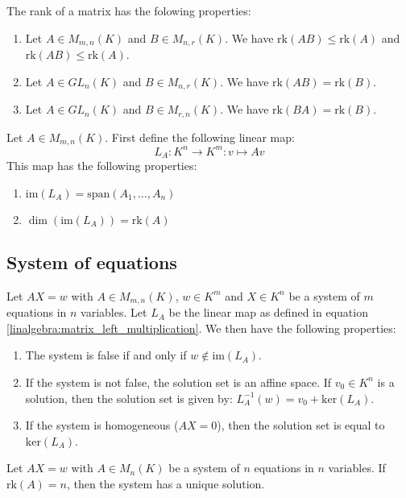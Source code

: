 	\begin{property}\label{linalgebra:rank_properties}
	        The rank of a matrix has the folowing properties:
        	\begin{enumerate}
			\item Let $A\in M_{m,n}(K)$ and $B\in M_{n,r}(K)$. We have $\text{rk}(AB)\leq\text{rk}(A)$ and $\text{rk}(AB)\leq\text{rk}(A)$.
        		\item Let $A\in GL_n(K)$ and $B\in M_{n,r}(K)$. We have $\text{rk}(AB)=\text{rk}(B)$.
		        \item Let $A\in GL_n(K)$ and $B\in M_{r,n}(K)$. We have $\text{rk}(BA)=\text{rk}(B)$.
		\end{enumerate}
	\end{property}
	\begin{property}\label{linalgebra:dim_matrix_left_multiplication}
	        Let $A\in M_{m,n}(K)$. First define the following linear map:
        	\begin{equation}
			\label{linalgebra:matrix_left_multiplication}
        		\boxed{L_A:K^n\rightarrow K^m:v\mapsto Av}
		\end{equation}
	        This map has the following properties:
        	\begin{enumerate}
        		\item $\text{im}(L_A) = \text{span}(A_1, ..., A_n)$
			\item $\dim(\text{im}(L_A))=\text{rk}(A)$
		\end{enumerate}
	\end{property}
    
\subsection{System of equations}

	\begin{theorem}\label{linalgebra:matrix_and_equations}
	        Let $AX=w$ with $A\in M_{m,n}(K)$, $w\in K^m$ and $X\in K^n$ be a system of $m$ equations in $n$ variables. Let $L_A$ be the linear map as defined in equation \ref{linalgebra:matrix_left_multiplication}. We then have the following properties:
        	\begin{enumerate}
			\item The system is false if and only if $w\not\in\text{im}(L_A)$.
        		\item If the system is not false, the solution set is an affine space. If $v_0\in K^n$ is a solution, then the solution set is given by: $L_A^{-1}(w)=v_0+\text{ker}(L_A)$.
		        \item If the system is homogeneous ($AX=0$), then the solution set is equal to $\text{ker}(L_A)$.
		\end{enumerate}
	\end{theorem}
	\begin{theorem}[Uniqueness]\label{linalgebra:rank_unique_solution}
	        Let $AX=w$ with $A\in M_n(K)$ be a system of $n$ equations in $n$ variables. If $\text{rk}(A)=n$, then the system has a unique solution.
	\end{theorem}
    
